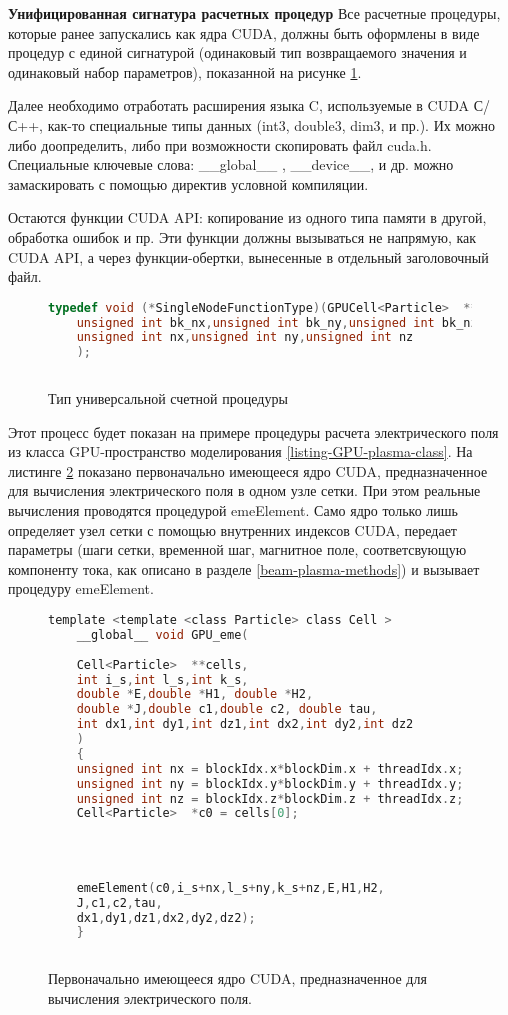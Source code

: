 \textbf{Унифицированная сигнатура расчетных процедур}
Все расчетные процедуры, которые ранее запускались как ядра CUDA, должны быть оформлены в виде процедур с единой сигнатурой (одинаковый тип возвращаемого значения и одинаковый набор параметров), показанной на рисунке \ref{listing-signature}.

Далее необходимо отработать расширения языка C, используемые в CUDA С/С++, как-то специальные типы данных
(int3, double3, dim3, и пр.). Их можно либо доопределить, либо при возможности скопировать файл cuda.h. Специальные ключевые слова: \_\_global\_\_ ,         \_\_device\_\_, и др. можно 
замаскировать с помощью директив условной компиляции.

Остаются функции CUDA API: копирование из одного типа памяти в другой, обработка ошибок и пр. Эти функции должны вызываться не напрямую, как CUDA API, а через функции-обертки, вынесенные в отдельный заголовочный файл.

\begin{figure}[h]
	\begin{lstlisting}[language=c]
	typedef void (*SingleNodeFunctionType)(GPUCell<Particle>  **cells,KernelParams *params,
	unsigned int bk_nx,unsigned int bk_ny,unsigned int bk_nz,
	unsigned int nx,unsigned int ny,unsigned int nz
	);
	
	\end{lstlisting}
	\caption{Тип универсальной счетной процедуры}
	\label{listing-signature}
\end{figure}

Этот процесс будет показан на примере процедуры расчета электрического поля из класса GPU-пространство моделирования \ref{listing-GPU-plasma-class}. На листинге \ref{Original-function} показано первоначально имеющееся ядро CUDA, предназначенное для вычисления электрического поля в одном узле сетки. При этом реальные вычисления проводятся процедурой emeElement. Само ядро только лишь определяет узел сетки с помощью внутренних индексов CUDA, передает параметры (шаги сетки, временной шаг, магнитное поле, соответсвующую компоненту тока, как описано в разделе \ref{beam-plasma-methods}) и вызывает процедуру emeElement.

\begin{figure}[h]
	\begin{lstlisting}[language=c]
	template <template <class Particle> class Cell >
	__global__ void GPU_eme(
	
	Cell<Particle>  **cells,
	int i_s,int l_s,int k_s,
	double *E,double *H1, double *H2,
	double *J,double c1,double c2, double tau,
	int dx1,int dy1,int dz1,int dx2,int dy2,int dz2
	)
	{
	unsigned int nx = blockIdx.x*blockDim.x + threadIdx.x;
	unsigned int ny = blockIdx.y*blockDim.y + threadIdx.y;
	unsigned int nz = blockIdx.z*blockDim.z + threadIdx.z;
	Cell<Particle>  *c0 = cells[0];
	
	
	
	
	emeElement(c0,i_s+nx,l_s+ny,k_s+nz,E,H1,H2,
	J,c1,c2,tau,
	dx1,dy1,dz1,dx2,dy2,dz2);
	}
	
	\end{lstlisting}
	\caption{Первоначально имеющееся ядро CUDA, предназначенное для вычисления электрического поля.}
	\label{Original-function}
\end{figure}


